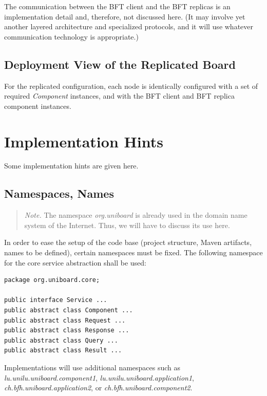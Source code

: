 \documentclass[oneside]{scrreprt}
\begin{document}
The communication between the BFT client and the BFT replicas
is an implementation detail and, therefore, not discussed here.
(It may involve yet another layered architecture and specialized
protocols, and it will use whatever communication technology
is appropriate.)


\section{Deployment View of the Replicated Board}

For the replicated configuration, each node is identically
configured with a set of required \emph{Component} instances, and
with the BFT client and BFT replica component instances.


\chapter{Implementation Hints}

Some implementation hints are given here.

\section{Namespaces, Names}

\begin{quote}
	\emph{Note.} The namespace \emph{org.uniboard} is already
	used in the domain name system of the Internet. Thus,
	we will have to discuss its use here.
\end{quote}

In order to ease the setup of the code base (project structure,
Maven artifacts, names to be defined), certain namespaces must be fixed.
The following namespace for the core service abstraction shall
be used:

\begin{lstlisting}
package org.uniboard.core;

public interface Service ...
public abstract class Component ...
public abstract class Request ...
public abstract class Response ...
public abstract class Query ...
public abstract class Result ...
\end{lstlisting}

Implementations will use additional namespaces such as
\emph{lu.unilu.uniboard.component1},
\emph{lu.unilu.uniboard.application1},
\emph{ch.bfh.uniboard.application2}, or
\emph{ch.bfh.uniboard.component2}.
\end{document}
